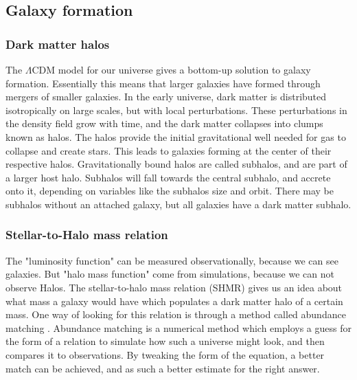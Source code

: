 

\subsection{Galaxy formation}

\subsubsection{Dark matter halos}

The $\Lambda$CDM model for our universe gives a bottom-up solution to galaxy formation. Essentially this means that larger galaxies have formed through mergers of smaller galaxies. In the early universe, dark matter is distributed isotropically on large scales, but with local perturbations. These perturbations in the density field grow with time, and the dark matter collapses into clumps known as halos. The halos provide the initial gravitational well needed for gas to collapse and create stars. This leads to galaxies forming at the center of their respective halos. Gravitationally bound halos are called subhalos, and are part of a larger host halo. Subhalos will fall towards the central subhalo, and accrete onto it, depending on variables like the subhalos size and orbit. There may be subhalos without an attached galaxy, but all galaxies have a dark matter subhalo.


\subsubsection{Stellar-to-Halo mass relation}

The "luminosity function" can be measured observationally, because we can see galaxies. But "halo mass function" come from simulations, because we can not observe Halos.
The stellar-to-halo mass relation (SHMR) gives us an idea about what mass a galaxy would have which populates a dark matter halo of a certain mass. One way of looking for this relation is through a method called abundance matching \parencite{None2000}. Abundance matching is a numerical method which employs a guess for the form of a relation to simulate how such a universe might look, and then compares it to observations. By tweaking the form of the equation, a better match can be achieved, and as such a better estimate for the right answer. 

